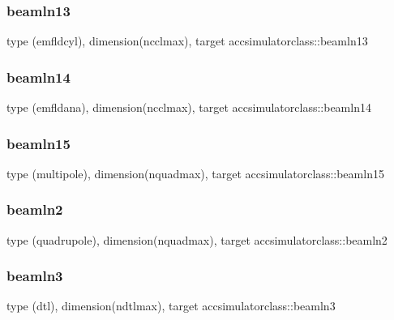 \subsubsection{\texorpdfstring{beamln13}{beamln13}}
{\footnotesize\ttfamily type (emfldcyl), dimension(ncclmax), target accsimulatorclass\+::beamln13}

\mbox{\label{namespaceaccsimulatorclass_a5633142ff697d3bca2adc68d9a78aedf}} 
\subsubsection{\texorpdfstring{beamln14}{beamln14}}
{\footnotesize\ttfamily type (emfldana), dimension(ncclmax), target accsimulatorclass\+::beamln14}

\mbox{\label{namespaceaccsimulatorclass_aa020b23d82bc9d6cf8dfa7bc24b3e691}} 
\subsubsection{\texorpdfstring{beamln15}{beamln15}}
{\footnotesize\ttfamily type (multipole), dimension(nquadmax), target accsimulatorclass\+::beamln15}

\mbox{\label{namespaceaccsimulatorclass_a84f0e00a948fce129634ef213a1e6146}} 
\subsubsection{\texorpdfstring{beamln2}{beamln2}}
{\footnotesize\ttfamily type (quadrupole), dimension(nquadmax), target accsimulatorclass\+::beamln2}

\mbox{\label{namespaceaccsimulatorclass_a676f0e0a8d52bb85779983a23300d307}} 
\subsubsection{\texorpdfstring{beamln3}{beamln3}}
{\footnotesize\ttfamily type (dtl), dimension(ndtlmax), target accsimulatorclass\+::beamln3}


